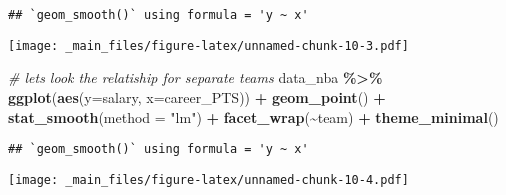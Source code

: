 \documentclass[
]{book}
\newenvironment{Shaded}{\begin{snugshade}}{\end{snugshade}}
\newcommand{\AttributeTok}[1]{\textcolor[rgb]{0.13,0.29,0.53}{#1}}
\newcommand{\CommentTok}[1]{\textcolor[rgb]{0.56,0.35,0.01}{\textit{#1}}}
\newcommand{\FunctionTok}[1]{\textcolor[rgb]{0.13,0.29,0.53}{\textbf{#1}}}
\newcommand{\NormalTok}[1]{#1}
\newcommand{\SpecialCharTok}[1]{\textcolor[rgb]{0.81,0.36,0.00}{\textbf{#1}}}
\newcommand{\StringTok}[1]{\textcolor[rgb]{0.31,0.60,0.02}{#1}}
\begin{document}
\begin{verbatim}
## `geom_smooth()` using formula = 'y ~ x'
\end{verbatim}

\texttt{[image: \_main\_files/figure-latex/unnamed-chunk-10-3.pdf]}

\begin{Shaded}
\begin{Highlighting}[]
\CommentTok{\# let\textquotesingle{}s look the relatiship for separate teams}
\NormalTok{data\_nba }\SpecialCharTok{\%\textgreater{}\%} 
  \FunctionTok{ggplot}\NormalTok{(}\FunctionTok{aes}\NormalTok{(}\AttributeTok{y=}\NormalTok{salary, }\AttributeTok{x=}\NormalTok{career\_PTS)) }\SpecialCharTok{+}
    \FunctionTok{geom\_point}\NormalTok{() }\SpecialCharTok{+} 
     \FunctionTok{stat\_smooth}\NormalTok{(}\AttributeTok{method =} \StringTok{"lm"}\NormalTok{) }\SpecialCharTok{+} 
        \FunctionTok{facet\_wrap}\NormalTok{(}\SpecialCharTok{\textasciitilde{}}\NormalTok{team) }\SpecialCharTok{+} 
       \FunctionTok{theme\_minimal}\NormalTok{()}
\end{Highlighting}
\end{Shaded}

\begin{verbatim}
## `geom_smooth()` using formula = 'y ~ x'
\end{verbatim}

\texttt{[image: \_main\_files/figure-latex/unnamed-chunk-10-4.pdf]}
\end{document}
